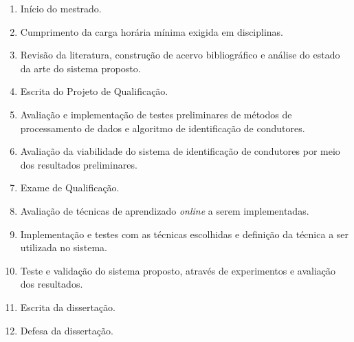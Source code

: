 \begin{enumerate}
	\item Início do mestrado.
	
	\item Cumprimento da carga horária mínima exigida em disciplinas.
	
    \item Revisão da literatura, construção de acervo bibliográfico e análise do estado da arte do sistema proposto.
    
    \item Escrita do Projeto de Qualificação.
    
    \item Avaliação e implementação de testes preliminares de métodos de processamento de dados e algoritmo de identificação de condutores.
    
    \item Avaliação da viabilidade do sistema de identificação de condutores por meio dos resultados preliminares.
    
    \item Exame de Qualificação.
    
    \item Avaliação de técnicas de aprendizado \textit{online} a serem implementadas.
    
    \item Implementação e testes com as técnicas escolhidas e definição da técnica a ser utilizada no sistema.
    
    \item Teste e validação do sistema proposto, através de experimentos e avaliação dos resultados.
    
    \item Escrita da dissertação.
    
    \item Defesa da dissertação.
    
\end{enumerate}

